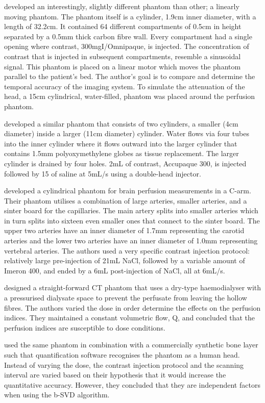 \cite{ganguly2012vitro} developed an interestingly, slightly different phantom than other;  a linearly moving phantom. The phantom itself is a cylinder, 1.9cm inner diameter, with a length of 32.2cm. It contained 64 different compartments of 0.5cm in height separated by a 0.5mm thick carbon fibre wall. Every compartment had a single opening where contrast, 300mgI/Omnipaque, is injected. The concentration of contrast that is injected in subsequent compartments, resemble a sinusoidal signal. This phantom is placed on a linear motor which moves the phantom parallel to the patient's bed. The author's goal is to compare and determine the temporal accuracy of the imaging system. To simulate the attenuation of the head, a 15cm cylindrical, water-filled, phantom was placed around the perfusion phantom. 

\cite{mathys2012phantom} developed a similar phantom that consists of two cylinders, a smaller (4cm diameter) inside a larger (11cm diameter) cylinder. Water flows via four tubes into the inner cylinder where it flows outward into the larger cylinder that contains 1.5mm polyoxymethylene globes as tissue replacement. The larger cylinder is drained by four holes. 2mL of contrast, Accupaque 300, is injected followed by 15 of saline at 5mL/s using a double-head injector.

\cite{boese2013performance} developed a cylindrical phantom for brain perfusion measurements in a C-arm. Their phantom utilises a combination of large arteries, smaller arteries, and a sinter board for the capillaries. The main artery splits into smaller arteries which in turn splits into sixteen even smaller ones that connect to the sinter board. The upper two arteries have an inner diameter of 1.7mm representing the carotid arteries and the lower two arteries have an inner diameter of 1.0mm representing vertebral arteries. The authors used a very specific contrast injection protocol: relatively large pre-injection of 21mL NaCl, followed by a variable amount of Imeron 400, and ended by a 6mL post-injection of NaCl, all at 6mL/s.

\cite{suzuki2017quantitative} designed a straight-forward \ac{CT} phantom that uses a dry-type haemodialyser with a pressurised dialysate space to prevent the perfusate from leaving the hollow fibres. The authors varied the dose in order determine the effects on the perfusion indices. They maintained a constant volumetric flow, Q, and concluded that the perfusion indices are susceptible to dose conditions. 

\cite{hashimoto2018effect} used the same phantom in combination with a commercially synthetic bone layer such that quantification software recognises the phantom as a human head. Instead of varying the dose, the contrast injection protocol and the scanning interval are varied based on their hypothesis that it would increase the quantitative accuracy. However, they concluded that they are independent factors when using the b-SVD algorithm. 

